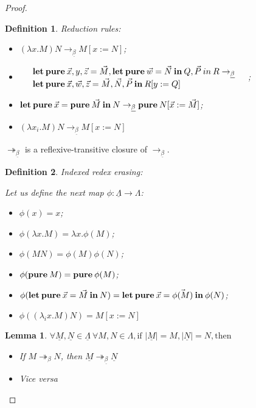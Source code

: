 \documentclass[a4paper]{article}
\newtheorem{lemma}{Lemma}
\newtheorem{defin}{Definition}
\begin{document}
\begin{proof}
\begin{defin} Reduction rules:

\begin{itemize}
  \item $(\lambda x. M) N \rightarrow_{\underline{\beta}} M [x := N]$;
  \item $\begin{array}{llll}
  & {\bf let \: pure \:} \vec{x}, y, \vec{z} = \vec{M}, {\bf let \: pure \: } \vec{w} = \vec{N} {\bf \: in \: } Q, \vec{P} {\: in \:} R \rightarrow_{\underline{\beta}} & \\
  & {\bf let \: pure \:} \vec{x}, \vec{w}, \vec{z} = \vec{M}, \vec{N}, \vec{P} \: { \bf in } \: R [y := Q]
  \end{array}$;
  \item ${\bf let \: pure \:} \vec{x} = {\bf pure \:} \vec{M} {\: \bf in \:} N \rightarrow_{\underline{\beta}} {\bf pure \:} N [\vec{x} := \vec{M}]$;
  \item $(\lambda x_i. M) N \rightarrow_{\underline{\beta}} M [x := N]$
\end{itemize}
\end{defin}

$\twoheadrightarrow_{\underline{\beta}}$ is a reflexive-transitive closure of $\rightarrow_{\underline{\beta}}$.

\begin{defin} Indexed redex erasing:

  Let us define the next map $\phi : \underline{\Lambda} \to \Lambda$:

  \begin{itemize}
    \item $\phi(x) = x$;
    \item $\phi(\lambda x. M) = \lambda x. \phi(M)$;
    \item $\phi(M N) = \phi(M) \phi(N)$;
    \item $\phi({\bf pure \:} M) = {\bf pure \:} \phi(M)$;
    \item $\phi({\bf let \: pure \:} \vec{x} = \vec{M} {\: \bf in \:} N) = {\bf let \: pure \:} \vec{x} = \vec{\phi(M)} {\: \bf in \:} \phi(N)$;
    \item $\phi((\lambda_i x. M) N) = M [x := N]$
  \end{itemize}
\end{defin}

\begin{lemma}

  $\forall \underline{M}, \underline{N} \in \underline{\Lambda} \: \forall M, N \in \Lambda, \text{if } |\underline{M}| = M, |\underline{N}| = N, \text{then}$
  \begin{itemize}
    \item If $M \twoheadrightarrow_{\beta} N$, then $\underline{M} \twoheadrightarrow_{\underline{\beta}} \underline{N}$
    \item Vice versa
  \end{itemize}
\end{lemma}


\end{proof}
\end{document}
